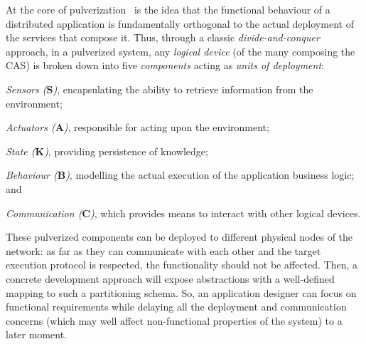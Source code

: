 \def\nm{0.35cm} %
\def\tpscale{0.8}
\newcommand{\agent}{node}
\renewcommand{\boldsymbol}[1]{\mathbf{#1}}
\newcommand{\LSens}{\boldsymbol{S}}
\newcommand{\LComp}{\boldsymbol{B}}
\newcommand{\LComm}{\boldsymbol{C}}
\newcommand{\LAct}{\boldsymbol{A}}
\newcommand{\LState}{\boldsymbol{K}}

At the core of pulverization~\cite{DBLP:journals/fi/CasadeiPPVW20} is the idea that the functional behaviour of a distributed application is fundamentally orthogonal to the actual deployment of the services that compose it.
%
Thus, through a classic \emph{divide-and-conquer} approach, in a pulverized system, any \emph{logical device} (of the many composing the CAS) is broken down into five \emph{components} acting as \emph{units of deployment}:
\begin{enumerate*}
 \item \emph{Sensors ($\LSens$)}, encapsulating the ability to retrieve information from the environment;
 \item \emph{Actuators ($\LAct$)}, responsible for acting upon the environment;
 \item \emph{State ($\LState$)}, providing persistence of knowledge;
 \item \emph{Behaviour ($\LComp$)}, modelling the actual execution of the application business logic; and
 \item \emph{Communication ($\LComm$)}, which provides means to interact with other logical devices.
\end{enumerate*}
%
These pulverized components can be deployed to different physical nodes of the network:
 as far as they can communicate with each other
 and the target execution protocol is respected,
 the functionality should not be affected.
%
Then, 
 a concrete development approach
 will expose abstractions
 with a well-defined mapping
 to such a partitioning schema.
%
So, an application designer can focus on functional requirements 
 while delaying all the deployment and communication concerns 
 (which may well affect non-functional properties of the system) 
 to a later moment. 

